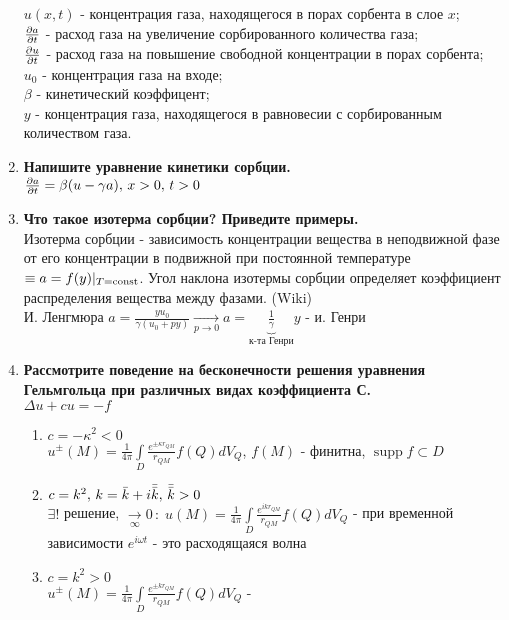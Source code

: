 \begin{enumerate}[label=\textbf{\underline{\arabic*.}}]
      $u(x,t)$ - концентрация газа, находящегося в порах сорбента в слое $x$;\\
      $\frac{\partial a}{\partial t}$ - расход газа на увеличение сорбированного количества газа;\\
      $\frac{\partial u}{\partial t}$ - расход газа на повышение свободной концентрации в порах сорбента;\\
      $u_0$ - концентрация газа на входе;\\
      $\beta$ - кинетический коэффицент;\\
      $y$ - концентрация газа, находящегося в равновесии с сорбированным количеством газа.
\item \textbf{Напишите уравнение кинетики сорбции.}\\
      $\frac{\partial a}{\partial t}=\beta(u-\gamma a),\,x>0,\,t>0 $
\item \textbf{Что такое изотерма сорбции? Приведите примеры.}\\
      Изотерма сорбции - зависимость концентрации вещества в неподвижной фазе от его концентрации в подвижной при постоянной температуре $ \equiv a = f(y)|_{T=\operatorname{const}} $. Угол наклона изотермы сорбции определяет коэффициент распределения вещества между фазами. (Wiki)\\
      И. Ленгмюра $a=\frac{yu_0}{\gamma(u_0+py)} \xrightarrow[p\to 0]{}
      a=\underbrace{\frac1{\gamma}}_\text{к-та Генри}y$ - и. Генри
\item \textbf{Рассмотрите поведение на бесконечности решения уравнения Гельмгольца при различных видах коэффициента С.}\\
      $\Delta u+cu=-f$\\
      \begin{enumerate}
      \item $c = -\kappa^2 < 0$\\
            $ u^\pm(M) = \frac{1}{4\pi}\int\limits_D\frac{e^{\pm\kappa r_{QM}}}{r_{QM}}f(Q)dV_Q $,
            $f(M)$ - финитна, $ \operatorname{supp}f \subset D $\\
      \item $c=k^2,\,k=\bar{k}+i\bar{\bar{k}},\,\bar{\bar{k}}>0 $\\
            $\exists !$ решение, $\xrightarrow[\infty]{}0\,:\;
            u(M) = \frac{1}{4\pi}\int\limits_D\frac{e^{ikr_{QM}}}{r_{QM}}f(Q)dV_Q $ -
            при временной зависимости $e^{i\omega t}$ - это расходящаяся волна
      \item $c=k^2>0 $\\
            $u^\pm(M) = \frac{1}{4\pi}\int\limits_D\frac{e^{\pm kr_{QM}}}{r_{QM}}f(Q)dV_Q $ -

\end{enumerate}
\end{enumerate}
